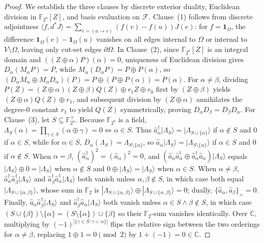 \documentclass[11pt,letterpaper]{article}
\theoremstyle{spectralthm}
\begin{document}
\begin{proof}
We establish the three clauses by discrete exterior duality, Euclidean division in $\mathbb{F}_{2^8}[Z]$, and basis evaluation on $\mathcal{F}$. Clause~(1) follows from discrete adjointness $\langle f, d^* J \rangle = \sum_{e=(u\to v)} (f(v) - f(u)) J(e)$: for $f = \mathbf{1}_\Omega$, the difference $\mathbf{1}_\Omega(v) - \mathbf{1}_\Omega(u)$ vanishes on all edges internal to $\Omega$ or internal to $V \setminus \Omega$, leaving only cut-set edges $\partial\Omega$. In Clause~(2), since $\mathbb{F}_{2^8}[Z]$ is an integral domain and $((Z\oplus\alpha)P)(\alpha) = 0$, uniqueness of Euclidean division gives $D_\alpha(M_\alpha P) = P$, while $M_\alpha(D_\alpha P) = P \oplus P(\alpha)$, so $(D_\alpha M_\alpha \oplus M_\alpha D_\alpha)(P) = P \oplus (P \oplus P(\alpha)) = P(\alpha)$. For $\alpha \neq \beta$, dividing $P(Z) = (Z\oplus\alpha)(Z\oplus\beta)Q(Z) \oplus r_1 Z \oplus r_0$ first by $(Z\oplus\beta)$ yields $(Z\oplus\alpha)Q(Z) \oplus r_1$, and subsequent division by $(Z\oplus\alpha)$ annihilates the degree-0 constant $r_1$ to yield $Q(Z)$ symmetrically, proving $D_\alpha D_\beta = D_\beta D_\alpha$. For Clause~(3), let $S \subseteq \mathbb{F}_{2^8}^\times$. Because $\mathbb{F}_{2^8}$ is a field, $\Lambda_S(\alpha) = \prod_{\gamma \in S}(\alpha \oplus \gamma) = 0 \iff \alpha \in S$. Thus $\hat{a}_\alpha^\dagger |\Lambda_S\rangle = |\Lambda_{S\cup\{\alpha\}}\rangle$ if $\alpha \notin S$ and $0$ if $\alpha \in S$, while for $\alpha \in S$, $D_\alpha(\Lambda_S) = \Lambda_{S\setminus\{\alpha\}}$, so $\hat{a}_\alpha |\Lambda_S\rangle = |\Lambda_{S\setminus\{\alpha\}}\rangle$ if $\alpha \in S$ and $0$ if $\alpha \notin S$. When $\alpha = \beta$, $(\hat{a}_\alpha^\dagger)^2 = (\hat{a}_\alpha)^2 = 0$, and $(\hat{a}_\alpha \hat{a}_\alpha^\dagger \oplus \hat{a}_\alpha^\dagger \hat{a}_\alpha)|\Lambda_S\rangle$ equals $|\Lambda_S\rangle \oplus 0 = |\Lambda_S\rangle$ when $\alpha \notin S$ and $0 \oplus |\Lambda_S\rangle = |\Lambda_S\rangle$ when $\alpha \in S$. When $\alpha \neq \beta$, $\hat{a}_\alpha^\dagger \hat{a}_\beta^\dagger |\Lambda_S\rangle$ and $\hat{a}_\beta^\dagger \hat{a}_\alpha^\dagger |\Lambda_S\rangle$ both vanish unless $\alpha,\beta \notin S$, in which case both equal $|\Lambda_{S\cup\{\alpha,\beta\}}\rangle$, whose sum in $\mathbb{F}_2$ is $|\Lambda_{S\cup\{\alpha,\beta\}}\rangle \oplus |\Lambda_{S\cup\{\alpha,\beta\}}\rangle = 0$; dually, $\{\hat{a}_\alpha, \hat{a}_\beta\}_+ = 0$. Finally, $\hat{a}_\alpha \hat{a}_\beta^\dagger |\Lambda_S\rangle$ and $\hat{a}_\beta^\dagger \hat{a}_\alpha |\Lambda_S\rangle$ both vanish unless $\alpha \in S \wedge \beta \notin S$, in which case $(S \cup \{\beta\}) \setminus \{\alpha\} = (S \setminus \{\alpha\}) \cup \{\beta\}$ so their $\mathbb{F}_2$-sum vanishes identically. Over $\mathbb{C}$, multiplying by $(-1)^{|\{\gamma \in S : \gamma < \alpha\}|}$ flips the relative sign between the two orderings for $\alpha \neq \beta$, replacing $1 \oplus 1 = 0 \pmod 2$ by $1 + (-1) = 0 \in \mathbb{C}$.
\end{proof}
\end{document}
